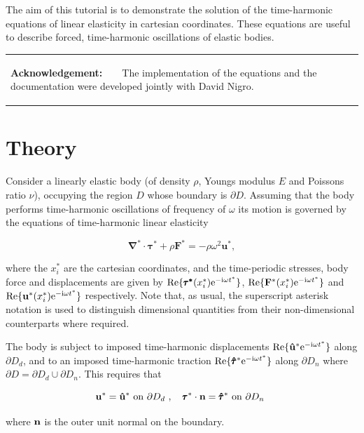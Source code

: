 The aim of this tutorial is to demonstrate the solution of the time-\/harmonic equations of linear elasticity in cartesian coordinates. These equations are useful to describe forced, time-\/harmonic oscillations of elastic bodies.

\begin{center} \tabulinesep=1mm
\begin{longtabu} spread 0pt [c]{*{1}{|X[-1]}|}
\hline
\begin{center} {\bfseries Acknowledgement\+:} ~\newline
~\newline
The implementation of the equations and the documentation were developed jointly with David Nigro. \end{center}    \\
\end{longtabu}
\end{center} 



 

\hypertarget{index_theory}{}\section{Theory}\label{index_theory}
Consider a linearly elastic body (of density $ \rho $, Young\textquotesingle{}s modulus $ E $ and Poisson\textquotesingle{}s ratio $ \nu $), occupying the region $ D $ whose boundary is $ \partial D $. Assuming that the body performs time-\/harmonic oscillations of frequency of $ \omega $ its motion is governed by the equations of time-\/harmonic linear elasticity \begin{center} \[ \pmb{\nabla}^*\cdot\pmb{\tau}^*+ \rho \mathbf{F}^*=-\rho\omega^2 \mathbf{u}^*, \] \end{center}  where the $ x_{i}^* $ are the cartesian coordinates, and the time-\/periodic stresses, body force and displacements are given by $ {\rm Re}\{\pmb{\tau^*}(x_{i}^*){\rm e}^{-{\rm i}\omega t^*}\} $, $ {\rm Re}\{\mathbf{F}^*(x_{i}^*){\rm e}^{-{\rm i}\omega t^*}\} $ and $ {\rm Re}\{\mathbf{u}^*(x_{i}^*){\rm e}^{-{\rm i}\omega t^*}\} $ respectively. Note that, as usual, the superscript asterisk notation is used to distinguish dimensional quantities from their non-\/dimensional counterparts where required.

The body is subject to imposed time-\/harmonic displacements $ {\rm Re}\{\mathbf{\hat{u}}^* {\rm e}^{-{\rm i}\omega t^*}\} $ along $ \partial D_d $, and to an imposed time-\/harmonic traction $ {\rm Re}\{ \pmb{\hat{\tau}}^* {\rm e}^{-{\rm i}\omega t^*}\} $ along $ \partial D_n $ where $ \partial D=\partial D_d\cup\partial D_n $. This requires that \begin{center} \[ \mathbf{u}^*=\mathbf{\hat{u}}^*\,\,\textrm{on $ \partial D_d $ },\quad \pmb{\tau}^* \cdot {\mathbf{n}}=\pmb{\hat{\tau}}^*\,\,\textrm{on $ \partial D_n $ } \] \end{center}  where $ {\bf n} $ is the outer unit normal on the boundary.

